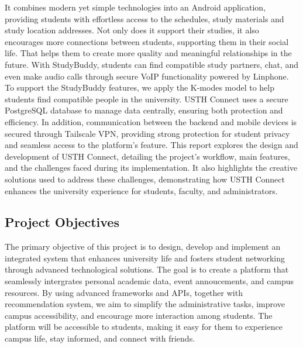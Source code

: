 \documentclass[12pt]{article}
\begin{document}
It combines modern yet simple technologies into an Android application, providing students with effortless access to the schedules, study materials and study location addresses.
Not only does it support their studies, it also encourages more connections between students, supporting them in their social life. That helps them to create more quality and meaningful relationships in the future.
With StudyBuddy, students can find compatible study partners, chat, and even make audio calls through secure VoIP functionality powered by Linphone.
To support the StudyBuddy features, we apply the K-modes model to help students find compatible people in the university.
USTH Connect uses a secure PostgreSQL database to manage data centrally, ensuring both protection and efficiency.
In addition, communication between the backend and mobile devices is secured through Tailscale VPN, providing strong protection for student privacy and seamless access to the platform's feature.
This report explores the design and development of USTH Connect, detailing the project's workflow, main features, and the challenges faced during its implementation. 
It also highlights the creative solutions used to address these challenges, demonstrating how USTH Connect enhances the university experience for students, faculty, and administrators.

\subsection{Project Objectives}
The primary objective of this project is to design, develop and implement an integrated system that enhances
university life and fosters student networking through advanced technological solutions.
The goal is to create a platform that seamlessly intergrates personal academic data, event annoucements, and campus resources.
By using advanced frameworks and APIs, together with recommendation system, we aim to simplify the administrative tasks, improve campus accessibility, 
and encourage more interaction among students.
The platform will be accessible to students, making it easy for them to experience campus life, stay informed, and connect with friends.
\end{document}
